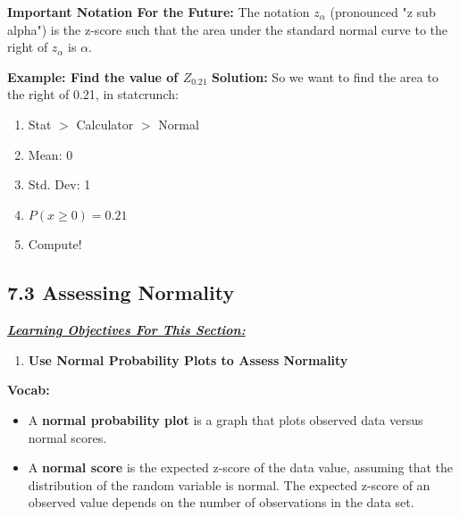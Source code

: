 \documentclass{report}
\begin{document}
    \textbf{Important Notation For the Future:}
  \bigbreak \noindent 
  The notation $z_{\alpha}$ (pronounced "z sub alpha") is the z-score such that the area under the standard normal curve to the right of $z_{\alpha}$ is $\alpha$. 
  \bigbreak \noindent 
  \begin{mdframed}
    \textbf{Example: Find the value of $Z_{0.21} $}
    \bigbreak \noindent 
    \textbf{Solution:}
    So we want to find the area to the right of 0.21, in statcrunch:
    \begin{enumerate}
      \item Stat $> $ Calculator $> $ Normal
      \item Mean: 0 
      \item Std. Dev: 1
      \item $P(x \geq 0) = 0.21$
      \item Compute!
    \end{enumerate}
  \end{mdframed}


  \pagebreak 
  \subsection*{7.3 Assessing Normality}
  \bigbreak \noindent 
  \textbf{\textit{\underline{Learning Objectives For This Section:}}}
  \begin{enumerate}
      \item \textbf{Use Normal Probability Plots to Assess Normality}
  \end{enumerate}
  \bigbreak \noindent 
  \textbf{Vocab:}
  \begin{itemize}
      \item A \textbf{normal probability plot} is a graph that plots observed data versus normal scores. 
      \item A \textbf{normal score} is the expected z-score of the data value, assuming that the distribution of the random variable is normal. The expected z-score of an observed value depends on the number of observations in the data set.
  \end{itemize}
\end{document}
